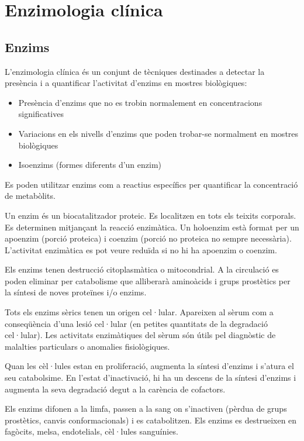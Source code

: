 \section{Enzimologia clínica}

\subsection{Enzims}
L'enzimologia clínica és un conjunt de tècniques destinades a detectar la presència i a quantificar l'activitat d'enzims en mostres biològiques:
\begin{itemize}
\item Presència d'enzims que no es trobin normalement en concentracions significatives
\item Variacions en els nivells d'enzims que poden trobar-se normalment en mostres biològiques
\item Isoenzims (formes diferents d'un enzim)
\end{itemize}

Es poden utilitzar enzims com a reactius específics per quantificar la concentració de metabòlits.

Un enzim és un biocatalitzador proteic. Es localitzen en tots els teixits corporals. Es determinen mitjançant la reacció enzimàtica. Un holoenzim està format per un apoenzim (porció proteica) i coenzim (porció no proteica no sempre necessària). L'activitat enzimàtica es pot veure reduïda si no hi ha apoenzim o coenzim.

Els enzims tenen destrucció citoplasmàtica o mitocondrial. A la circulació es poden eliminar per catabolisme que alliberarà aminoàcids i grups prostètics per la síntesi de noves proteïnes i/o enzims.

Tots els enzims sèrics tenen un origen cel·lular. Apareixen al sèrum com a conseqüència d'una lesió cel·lular (en petites quantitats de la degradació cel·lular). Les activitats enzimàtiques del sèrum són útils pel diagnòstic de malalties particulars o anomalies fisiològiques.

Quan les cèl·lules estan en proliferació, augmenta la síntesi d'enzims i s'atura el seu catabolsime. En l'estat d'inactivació, hi ha un descens de la síntesi d'enzims i augmenta la seva degradació degut a la carència de cofactors. 

Els enzims difonen a la limfa, passen a la sang on s'inactiven (pèrdua de grups prostètics, canvis conformacionals) i es catabolitzen. Els enzims es destrueixen en fagòcits, melsa, endotelials, cèl·lules sanguínies.


